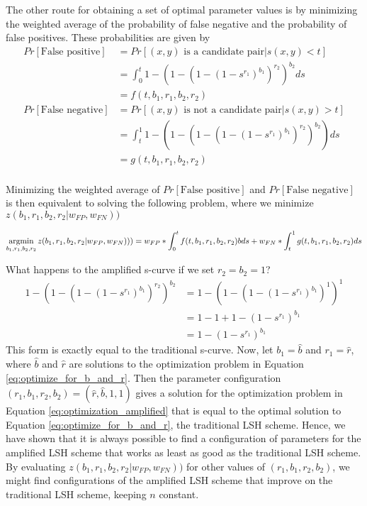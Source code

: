The other route for obtaining a set of optimal parameter values is by minimizing the weighted average of the probability of false negative and the probability of false positives. These probabilities are given by  
\begin{equation}
    \begin{aligned}
        Pr[\text{False positive}] &= Pr[(x, y)\text{ is a candidate pair}| s(x, y) < t ] \\
                                  &= \int_{0}^{t}1 - (1- (1 - (1-s^{r_1})^{b_1})^{r_2})^{b_2}ds \\
                                  &= f(t,b_1,r_1,b_2,r_2) \\
        Pr[\text{False negative}] &= Pr[(x, y)\text{ is not a candidate pair}| s(x, y) > t ] \\
                                  &= \int_{t}^{1}1 - (1 - (1- (1 - (1-s^{r_1})^{b_1})^{r_2})^{b_2})ds \\
                                  &= g(t,b_1,r_1,b_2,r_2) \\
    \end{aligned}
    \label{eq:amplified_version_of_prob_neg_pos}
\end{equation}

Minimizing the weighted average of $ Pr[\text{False positive}]$ and $Pr[\text{False negative}]$ is then equivalent to solving the following problem, where we minimize $z(b_1,r_1,b_2,r_2| w_{FP}, w_{FN}))$

\begin{equation}
    \operatorname*{argmin}_{b_1,r_1,b_2,r_2}  z(b_1,r_1,b_2,r_2| w_{FP}, w_{FN}))) = w_{FP} *  \int_{0}^{t}f(t,b_1,r_1,b_2,r_2)bds + w_{FN} * \int_{t}^{1}g(t,b_1,r_1,b_2,r_2)ds
    \label{eq:optimization_amplified}
\end{equation}

What happens to the amplified s-curve if we set $r_2=b_2=1$? 
\begin{equation}
    \begin{aligned}
    1 - (1- (1 - (1-s^{r_1})^{b_1})^{r_2})^{b_2} &= 1 - (1- (1 - (1-s^{r_1})^{b_1})^{1}
    )^{1} \\
    &= 1 - 1 + 1 -(1-s^{r_1})^{b_1}\\
    &= 1 - (1-s^{r_1})^{b_1}
    \end{aligned}
\end{equation}
This form is exactly equal to the traditional s-curve. Now, let $b_1=\hat{b}$ and $r_1=\hat{r}$, where $\hat{b}$ and $\hat{r}$ are solutions to the optimization problem in Equation \ref{eq:optimize_for_b_and_r}. Then the parameter configuration $(r_1,b_1,r_2,b_2) = (\hat{r}, \hat{b},1,1)$ gives a solution for the optimization problem in Equation \ref{eq:optimization_amplified} that is equal to the optimal solution to Equation \ref{eq:optimize_for_b_and_r}, the traditional LSH scheme. Hence, we have shown that it is always possible to find a configuration of parameters for the amplified LSH scheme that works as least as good as the traditional LSH scheme. By evaluating $z(b_1,r_1,b_2,r_2| w_{FP}, w_{FN}))$ for other values of $(r_1,b_1,r_2,b_2)$, we might find configurations of the amplified LSH scheme that improve on the traditional LSH scheme, keeping $n$ constant.

